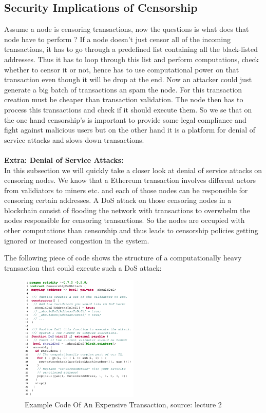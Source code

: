 \documentclass{article}
\begin{document}
\subsection{Security Implications of Censorship}
Assume a node is censoring transactions, now the questions is what does that node have to perform ? If a node doesn't just censor all of the incoming transactions, it has to go through a predefined list containing all the black-listed addresses. Thus it has to loop through this list and perform computations, check whether to censor it or not, hence has to use computational power on that transaction even though it will be drop at the end. Now an attacker could just generate a big batch of transactions an spam the node. For this transaction creation must be cheaper than transaction validation. The node then has to process this transactions and check if it should execute them. So we se that on the one hand censorship's is important to provide some legal compliance and fight against malicious users but on the other hand it is a platform for denial of service attacks and slows down transactions.
\\
\\
\textbf{Extra: Denial of Service Attacks:}\\
In this subsection we will quickly take a closer look at denial of service attacks on censoring nodes. We know that a Ethereum transaction involves different actors from validiators to miners etc. and each of those nodes can be responsible for censoring certain addresses. A DoS attack on those censoring nodes in a blockchain consist of flooding the network with transactions to overwhelm the nodes responsible for censoring transactions. So the nodes are occupied with other computations than censorship and thus leads to censorship policies getting ignored or increased  congestion in the system.

The following piece of code shows the structure of a computationally heavy transaction that could execute such a DoS attack:

\begin{figure}[h]
    \centering
    \includegraphics[width=0.5\textwidth]{dos-attack.png} 
    \caption{Example Code Of An Expensive Transaction, \scriptsize{source: lecture 2}}
    \label{fig:DoS-attack}
\end{figure}
\end{document}
